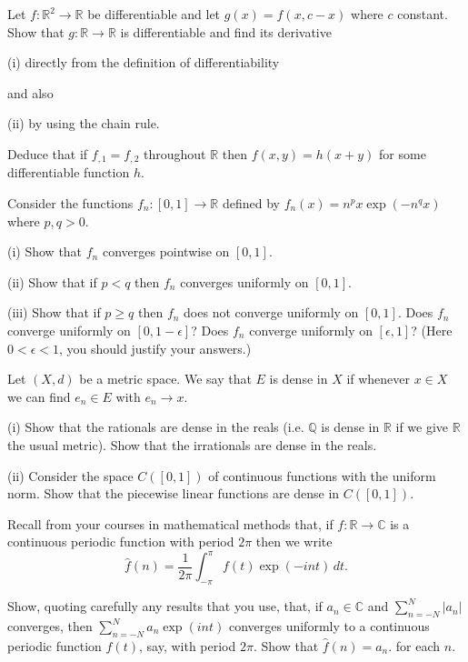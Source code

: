 \begin{question}
Let $f:{\mathbb R}^{2}\rightarrow{\mathbb R}$
be differentiable  and let $g(x)=f(x,c-x)$ where $c$
constant. Show that $g:{\mathbb R}\rightarrow{\mathbb R}$
is differentiable and find its derivative

(i) directly from the definition of differentiability

\noindent
and also

(ii) by using the chain  rule.

\noindent
Deduce that if $f_{,1}=f_{,2}$ throughout ${\mathbb R}$
then $f(x,y)=h(x+y)$ for some differentiable
function $h$.

\end{question}
\begin{question}
[Traditional] Consider the functions
$f_{n}:[0,1]\rightarrow{\mathbb R}$ defined by
$f_{n}(x)=n^{p}x\exp(-n^{q}x)$ where $p,q>0$.

(i) Show that $f_{n}$ converges pointwise on $[0,1]$.

(ii) Show that if $p<q$ then $f_{n}$ converges uniformly
on $[0,1]$.

(iii) Show that if $p\geq q$ then $f_{n}$ does not converge
uniformly on $[0,1]$. Does $f_{n}$ converge
uniformly on $[0,1-\epsilon]$? 
Does $f_{n}$ converge
uniformly on $[\epsilon,1]$?
(Here $0<\epsilon<1$, you should justify your answers.)

\end{question}
\begin{question}
Let $(X,d)$ be a metric space. We say
that $E$ is dense in $X$ if whenever $x\in X$
we can find $e_{n}\in E$ with $e_{n}\rightarrow x$.

(i) Show that the rationals are dense in the reals
(i.e. $\mathbb Q$ is dense in $\mathbb R$ if we give
$\mathbb R$ the usual metric). Show that the
irrationals are dense in the reals.


(ii) Consider the space $C([0,1])$ of continuous
functions with the uniform norm. Show that the
piecewise linear functions are dense in $C([0,1])$.

\end{question}
\begin{question}\label{4.3}
Recall from your courses
in mathematical methods that, if 
$f:{\mathbb R}\rightarrow{\mathbb C}$ is a 
continuous periodic function with period $2\pi$
then we  write
\[\hat{f}(n)=\frac{1}{2\pi}
\int_{-\pi}^{\pi}f(t)\exp(-int)\,dt.\]

Show, quoting carefully any results that you use,
that, if $a_{n}\in{\mathbb C}$ and 
$\sum_{n=-N}^{N} |a_{n}|$ converges,
then $\sum_{n=-N}^{N} a_{n}\exp(int)$ converges
uniformly to a continuous periodic function
$f(t)$, say, with period $2\pi$.
Show that $\hat{f}(n)=a_{n}$. for each $n$.

\end{question}
